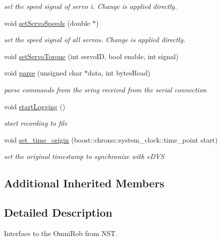 \begin{DoxyCompactItemize}
\begin{DoxyCompactList}\small\item\em set the speed signal of servo i. Change is applied directly. \end{DoxyCompactList}\item 
void \hyperlink{class_omni_robot_a2f3365750b17b172ef265fb94e25c73a}{set\+Servo\+Speeds} (double $\ast$)
\begin{DoxyCompactList}\small\item\em set the speed signal of all servos. Change is applied directly. \end{DoxyCompactList}\item 
void \hyperlink{class_omni_robot_a01e9c0201e9bcd1ff6b3f3039e910937}{set\+Servo\+Torque} (int servo\+I\+D, bool enable, int signal)
\item 
void \hyperlink{class_omni_robot_a27f0a605b283a8e1a49b5829c656edd8}{parse} (unsigned char $\ast$data, int bytes\+Read)
\begin{DoxyCompactList}\small\item\em parse commands from the sring received from the serial connection \end{DoxyCompactList}\item 
void \hyperlink{class_omni_robot_ad7b2e7cf5cca375cfc9ba047264dfcad}{start\+Logging} ()
\begin{DoxyCompactList}\small\item\em start recording to file \end{DoxyCompactList}\item 
\hypertarget{class_omni_robot_a899ff538efad531b391e84182a6ed961}{}void \hyperlink{class_omni_robot_a899ff538efad531b391e84182a6ed961}{set\+\_\+time\+\_\+origin} (boost\+::chrono\+::system\+\_\+clock\+::time\+\_\+point start)\label{class_omni_robot_a899ff538efad531b391e84182a6ed961}

\begin{DoxyCompactList}\small\item\em set the original timestamp to synchronize with e\+D\+V\+S \end{DoxyCompactList}\end{DoxyCompactItemize}
\subsection*{Additional Inherited Members}


\subsection{Detailed Description}
Interface to the Omni\+Rob from N\+S\+T. 

